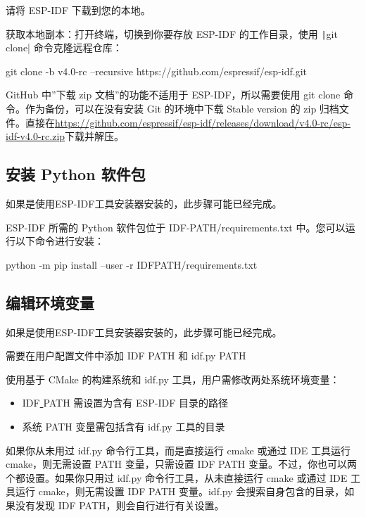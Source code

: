 请将 ESP-IDF 下载到您的本地。

获取本地副本：打开终端，切换到你要存放 ESP-IDF 的工作目录，使用 \texttt|git clone| 命令克隆远程仓库：

\begin{tcolorbox}
    git clone -b v4.0-rc --recursive https://github.com/espressif/esp-idf.git
\end{tcolorbox}

GitHub 中”下载 zip 文档”的功能不适用于 ESP-IDF，所以需要使用 git clone 命令。作为备份，可以在没有安装 Git 的环境中下载 Stable version 的 zip 归档文件。直接在\url{https://github.com/espressif/esp-idf/releases/download/v4.0-rc/esp-idf-v4.0-rc.zip}下载并解压。

\subsection{安装 Python 软件包}

如果是使用ESP-IDF工具安装器安装的，此步骤可能已经完成。

ESP-IDF 所需的 Python 软件包位于 IDF-PATH/requirements.txt 中。您可以运行以下命令进行安装：


\begin{tcolorbox}
    python -m pip install --user -r IDFPATH/requirements.txt
\end{tcolorbox}

\subsection{编辑环境变量}

如果是使用ESP-IDF工具安装器安装的，此步骤可能已经完成。

需要在用户配置文件中添加 IDF PATH 和 idf.py PATH

使用基于 CMake 的构建系统和 idf.py 工具，用户需修改两处系统环境变量：

\begin{itemize}
    \item IDF\underline{ }PATH 需设置为含有 ESP-IDF 目录的路径
    \item 系统 PATH 变量需包括含有 idf.py 工具的目录
\end{itemize}

如果你从未用过 idf.py 命令行工具，而是直接运行 cmake 或通过 IDE 工具运行 cmake，则无需设置 PATH 变量，只需设置 IDF PATH 变量。不过，你也可以两个都设置。如果你只用过 idf.py 命令行工具，从未直接运行 cmake 或通过 IDE 工具运行 cmake，则无需设置 IDF PATH 变量。idf.py 会搜索自身包含的目录，如果没有发现 IDF PATH，则会自行进行有关设置。

